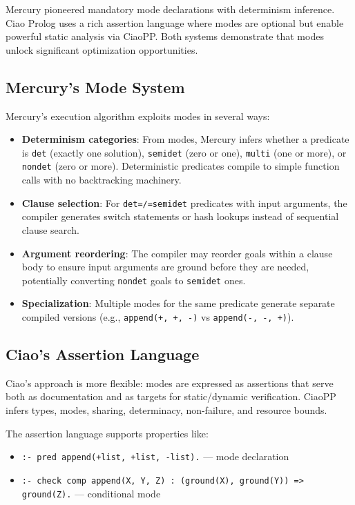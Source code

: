 \documentclass[11pt]{article}
\begin{document}
Mercury pioneered mandatory mode declarations with determinism inference. Ciao
Prolog uses a rich assertion language where modes are optional but enable powerful
static analysis via CiaoPP. Both systems demonstrate that modes unlock significant
optimization opportunities.
\subsection{Mercury's Mode System}
\label{sec:org9ba4e2d}

Mercury's execution algorithm exploits modes in several ways:

\begin{itemize}
\item \textbf{Determinism categories}: From modes, Mercury infers whether a predicate is
\texttt{det} (exactly one solution), \texttt{semidet} (zero or one), \texttt{multi} (one or more),
or \texttt{nondet} (zero or more). Deterministic predicates compile to simple function
calls with no backtracking machinery.
\item \textbf{Clause selection}: For \texttt{det=/=semidet} predicates with input arguments, the
compiler generates switch statements or hash lookups instead of sequential
clause search.
\item \textbf{Argument reordering}: The compiler may reorder goals within a clause body to
ensure input arguments are ground before they are needed, potentially converting
\texttt{nondet} goals to \texttt{semidet} ones.
\item \textbf{Specialization}: Multiple modes for the same predicate generate separate
compiled versions (e.g., \texttt{append(+, +, -)} vs \texttt{append(-, -, +)}).
\end{itemize}
\subsection{Ciao's Assertion Language}
\label{sec:org2e63603}

Ciao's approach is more flexible: modes are expressed as assertions that serve
both as documentation and as targets for static/dynamic verification. CiaoPP
infers types, modes, sharing, determinacy, non-failure, and resource bounds.

The assertion language supports properties like:
\begin{itemize}
\item \texttt{:- pred append(+list, +list, -list).} --- mode declaration
\item \texttt{:- check comp append(X, Y, Z) : (ground(X), ground(Y)) => ground(Z).} --- conditional mode
\end{itemize}
\end{document}
